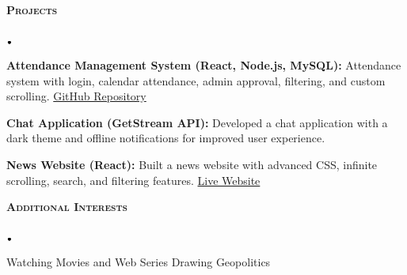 \documentclass[11pt]{article}
\newcommand{\lineunder}{\vspace*{-8pt} \\ \hspace*{-18pt} \hrulefill \\}
\newcommand{\header}[1]{{\hspace*{-15pt}\vspace*{6pt} \textsc{#1}} \vspace*{-6pt} \lineunder}
\newcommand{\lbt}{\,\begin{picture}(-1,1)(-1,-3)\circle*{3}\end{picture}\ }
\newenvironment{achievements}{
    \begin{list}{$\lbt$}{
        \topsep 0pt
        \itemsep 0pt
        \addtolength{\leftmargin}{-0.1in}
    }
}
{
    \vspace*{4pt}
    \end{list}
}
\begin{document}
\header{\textbf{Projects}}
\begin{achievements}
    \item \textbf{Attendance Management System (React, Node.js, MySQL):} Attendance system with login, calendar attendance, admin approval, filtering, and custom scrolling. \href{https://github.com/Subha2901/MarkAttendence}{GitHub Repository}

    \smallskip

    \item \textbf{Chat Application (GetStream API):} Developed a chat application with a dark theme and offline notifications for improved user experience.

    \smallskip

    \item \textbf{News Website (React):} Built a news website with advanced CSS, infinite scrolling, search, and filtering features. \href{https://663b1851b2d1c2c5a8217733--lovely-tiramisu-c6edef.netlify.app}{Live Website}
\end{achievements}


\header{\textbf{Additional Interests}}
\begin{achievements}
\item Watching Movies and Web Series \textbullet{} Drawing \textbullet{} Geopolitics
\end{achievements}
\end{document}
